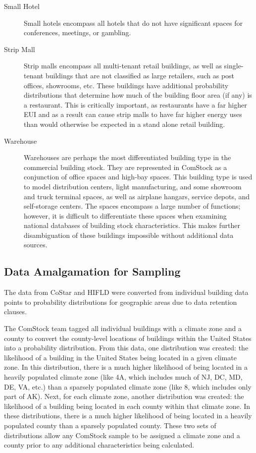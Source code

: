 \begin{description}
\item[Small Hotel] Small hotels encompass all hotels that do not have significant spaces for conferences, meetings, or gambling.
\item[Strip Mall] Strip malls encompass all multi-tenant retail buildings, as well as single-tenant buildings that are not classified as large retailers, such as post offices, showrooms, etc. These buildings have additional probability distributions that determine how much of the building floor area (if any) is a restaurant. This is critically important, as restaurants have a far higher EUI and as a result can cause strip malls to have far higher energy uses than would otherwise be expected in a stand alone retail building.
\item[Warehouse] Warehouses are perhaps the most differentiated building type in the commercial building stock. They are represented in ComStock as a conjunction of office spaces and high-bay spaces. This building type is used to model distribution centers, light manufacturing, and some showroom and truck terminal spaces, as well as airplane hangars, service depots, and self-storage centers. The spaces encompass a large number of functions; however, it is difficult to differentiate these spaces when examining national databases of building stock characteristics. This makes further disambiguation of these buildings impossible without additional data sources.
\end{description}

\subsection{Data Amalgamation for Sampling} \label{sec:3.1.3data amalgamation for sampling}

The data from CoStar and HIFLD were converted from individual building data points to probability distributions for geographic areas due to data retention clauses. 

The ComStock team tagged all individual buildings with a climate zone and a county to convert the county-level locations of buildings within the United States into a probability distribution. From this data, one distribution was created: the likelihood of a building in the United States being located in a given climate zone. In this distribution, there is a much higher likelihood of being located in a heavily populated climate zone (like 4A, which includes much of NJ, DC, MD, DE, VA, etc.) than a sparsely populated climate zone (like 8, which includes only part of AK). Next, for each climate zone, another distribution was created: the likelihood of a building being located in each county within that climate zone. In these distributions, there is a much higher likelihood of being located in a heavily populated county than a sparsely populated county. These two sets of distributions allow any ComStock sample to be assigned a climate zone and a county prior to any additional characteristics being calculated.


